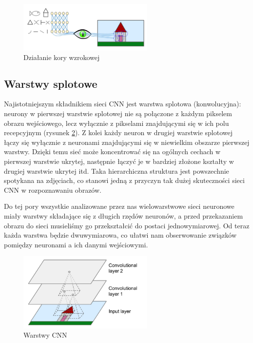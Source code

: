 \documentclass{article}
\begin{document}
\begin{figure}[H]
	\centering
	\includegraphics[width=0.6\textwidth,keepaspectratio=true]{kora_wzrokowa}
	\caption{Działanie kory wzrokowej \cite{geron}}
	\label{kora_wzrokowa}
\end{figure}

\subsection{Warstwy splotowe}
Najistotniejszym składnikiem sieci CNN jest warstwa splotowa (konwolucyjna): neurony w pierwszej warstwie splotowej nie są połączone z każdym pikselem obrazu wejściowego, lecz wyłącznie z pikselami znajdującymi się w ich polu recepcyjnym (rysunek \ref{warstwa_splotowa}). Z kolei każdy neuron w drugiej warstwie splotowej łączy się wyłącznie z neuronami znajdującymi się w niewielkim obszarze pierwszej warstwy. Dzięki temu sieć może koncentrować się na ogólnych cechach w pierwszej warstwie ukrytej, następnie łączyć je w bardziej złożone kształty w drugiej warstwie ukrytej itd. Taka hierarchiczna struktura jest powszechnie spotykana na zdjęciach, co stanowi jedną z przyczyn tak dużej skuteczności sieci CNN w rozpoznawaniu obrazów. \cite{geron}

Do tej pory wszystkie analizowane przez nas wielowarstwowe sieci neuronowe miały warstwy składające się z długich rzędów neuronów, a przed przekazaniem obrazu do sieci musieliśmy go przekształcić do postaci jednowymiarowej. Od teraz każda warstwa będzie dwuwymiarowa, co ułatwi nam obserwowanie związków pomiędzy neuronami a ich danymi wejściowymi. \cite{geron}
\begin{figure}[H]
	\centering
	\includegraphics[width=0.6\textwidth,keepaspectratio=true]{warstwa_splotowa}
	\caption{Warstwy CNN \cite{geron}}
	\label{warstwa_splotowa}
\end{figure}
\end{document}
